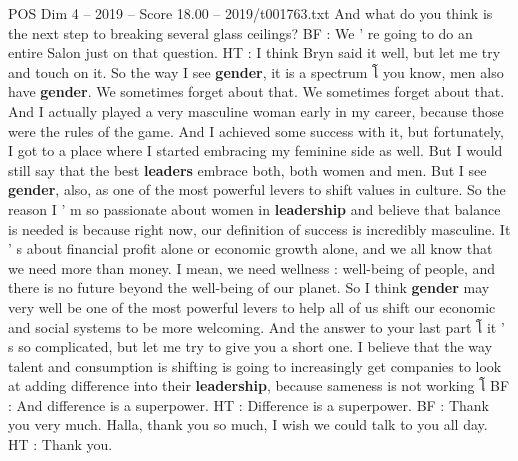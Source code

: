 \begin{textsample}{POS Dim 4 – 2019 – Score 18.00 – 2019/t001763.txt}
And what do you think is the next step to breaking several glass ceilings?
BF : We ' re going to do an entire Salon just on that question.
HT : I think Bryn said it well, but let me try and touch on it.
So the way I see \textbf{gender}, it is a spectrum โ you know, men also have \textbf{gender}.
We sometimes forget about that.
We sometimes forget about that.
And I actually played a very masculine woman early in my career, because those were the rules of the game.
And I achieved some success with it, but fortunately, I got to a place where I started embracing my feminine side as well.
But I would still say that the best \textbf{leaders} embrace both, both women and men.
But I see \textbf{gender}, also, as one of the most powerful levers to shift values in culture.
So the reason I ' m so passionate about women in \textbf{leadership} and believe that balance is needed is because right now, our definition of success is incredibly masculine.
It ' s about financial profit alone or economic growth alone, and we all know that we need more than money.
I mean, we need wellness : well-being of people, and there is no future beyond the well-being of our planet.
So I think \textbf{gender} may very well be one of the most powerful levers to help all of us shift our economic and social systems to be more welcoming.
And the answer to your last part โ it ' s so complicated, but let me try to give you a short one.
I believe that the way talent and consumption is shifting is going to increasingly get companies to look at adding difference into their \textbf{leadership}, because sameness is not working โ BF : And difference is a superpower.
HT : Difference is a superpower.
BF : Thank you very much.
Halla, thank you so much, I wish we could talk to you all day.
HT : Thank you.

\end{textsample}
